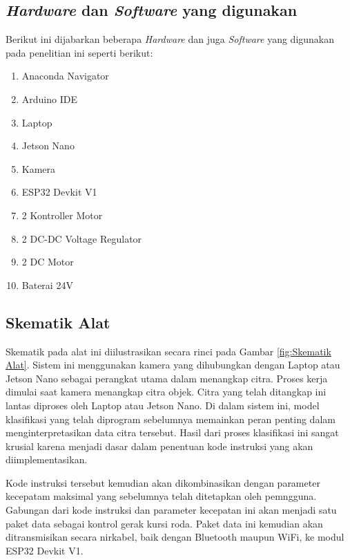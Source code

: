 \subsection{\emph{Hardware} dan \emph{Software} yang digunakan}
Berikut ini dijabarkan beberapa \emph{Hardware} dan juga \emph{Software} yang digunakan pada penelitian ini seperti berikut:
\begin{enumerate}[nosep]
    \item Anaconda Navigator
    \item Arduino IDE 
    \item Laptop 
    \item Jetson Nano
    \item Kamera
    \item ESP32 Devkit V1
    \item 2 Kontroller Motor
    \item 2 DC-DC Voltage Regulator
    \item 2 DC Motor
    \item Baterai 24V
\end{enumerate}

\subsection{Skematik Alat}

Skematik pada alat ini diilustrasikan secara rinci pada Gambar \ref{fig:Skematik Alat}. Sistem ini menggunakan kamera yang dihubungkan dengan Laptop atau Jetson Nano sebagai perangkat utama dalam menangkap citra. Proses kerja dimulai saat kamera menangkap citra objek. Citra yang telah ditangkap ini lantas diproses oleh Laptop atau Jetson Nano. Di dalam sistem ini, model klasifikasi yang telah diprogram sebelumnya memainkan peran penting dalam menginterpretasikan data citra tersebut. Hasil dari proses klasifikasi ini sangat krusial karena menjadi dasar dalam penentuan kode instruksi yang akan diimplementasikan.

Kode instruksi tersebut kemudian akan dikombinasikan dengan parameter kecepatam maksimal yang sebelumnya telah ditetapkan oleh pemngguna. Gabungan dari kode instruksi dan parameter kecepatan ini akan menjadi satu paket data sebagai kontrol gerak kursi roda. Paket data ini kemudian akan ditransmisikan secara nirkabel, baik dengan Bluetooth maupun WiFi, ke modul ESP32 Devkit V1. 

